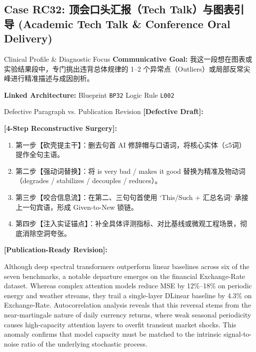 \subsection{Case RC32: 顶会口头汇报（Tech Talk）与图表引导 (Academic Tech Talk \& Conference Oral Delivery)}\label{case:RC32}
\begin{ConceptBox}{Clinical Profile \& Diagnostic Focus}
\textbf{Communicative Goal:} 我这一段想在图表或实验结果段中，专门挑出违背总体规律的 1--2 个异常点（Outliers）或局部反常尖峰进行精准描述与成因剖析。\par
\textbf{Linked Architecture:} Blueprint \texttt{BP32} \enspace\textbar\enspace Logic Rule \texttt{L002}
\end{ConceptBox}
\begin{ExampleBox}{Defective Paragraph vs. Publication Revision}
\textbf{\color{TargetHighlight}[Defective Draft]:}\par
{}\par\vspace{6pt}
\textbf{\color{AcadForest}[4-Step Reconstructive Surgery]:}
\begin{enumerate}[label=\textbf{\color{AcadNavy}Step \arabic*:}, leftmargin=2em]
  \item 第一步【砍壳提主干】：删去句首 AI 修辞帽与口语词，将核心实体（≤5词）提作全句主语。
  \item 第二步【强动词替换】：将 is very bad / makes it good 替换为精准及物动词（degrades / stabilizes / decouples / reduces）。
  \item 第三步【咬合信息流】：在第二、三句句首使用 `This/Such + 汇总名词` 承接上一句宾语，形成 Given-to-New 锁链。
  \item 第四步【注入实证锚点】：补全具体评测指标、对比基线或微观工程场景，彻底消除空洞夸张。
\end{enumerate}\vspace{4pt}
\textbf{\color{AcadNavy}[Publication-Ready Revision]:}\par
Although deep spectral transformers outperform linear baselines across six of the seven benchmarks, a notable departure emerges on the financial Exchange-Rate dataset. Whereas complex attention models reduce MSE by 12\%--18\% on periodic energy and weather streams, they trail a single-layer DLinear baseline by 4.3\% on Exchange-Rate. Autocorrelation analysis reveals that this reversal stems from the near-martingale nature of daily currency returns, where weak seasonal periodicity causes high-capacity attention layers to overfit transient market shocks. This anomaly confirms that model capacity must be matched to the intrinsic signal-to-noise ratio of the underlying stochastic process.
\end{ExampleBox}
